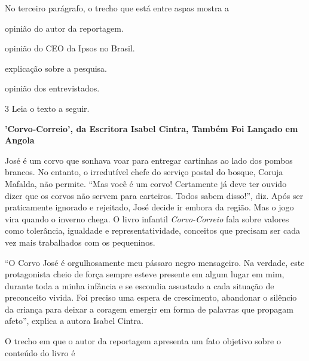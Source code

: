 No terceiro parágrafo, o trecho que está entre aspas mostra a

\begin{escolha}
\item opinião do autor da reportagem.

\item opinião do CEO da Ipsos no Brasil.

\item explicação sobre a pesquisa.

\item opinião dos entrevistados.
\end{escolha}

\pagebreak
\num{3} Leia o texto a seguir.

\begin{myquote}
\textbf{'Corvo-Correio', da Escritora Isabel Cintra, Também Foi Lançado 
em Angola}

José é um corvo que sonhava voar para entregar cartinhas ao lado dos
pombos brancos. No entanto, o irredutível chefe do serviço postal do
bosque, Coruja Mafalda, não permite. ``Mas você é um corvo! Certamente já
deve ter ouvido dizer que os corvos não servem para carteiros. Todos
sabem disso!'', diz. Após ser praticamente ignorado e rejeitado, José
decide ir embora da região. Mas o jogo vira quando o inverno chega. O
livro infantil \textit{Corvo-Correio} fala sobre valores como tolerância,
igualdade e representatividade, conceitos que precisam ser cada vez mais
trabalhados com os pequeninos.

``O Corvo José é orgulhosamente meu pássaro negro mensageiro. Na
verdade, este protagonista cheio de força sempre esteve presente em
algum lugar em mim, durante toda a minha infância e se escondia
assustado a cada situação de preconceito vivida. Foi preciso uma espera
de crescimento, abandonar o silêncio da criança para deixar a coragem
emergir em forma de palavras que propagam afeto'', explica a autora
Isabel Cintra.

\end{myquote}

O trecho em que o autor da reportagem apresenta um fato objetivo sobre
o conteúdo do livro é

